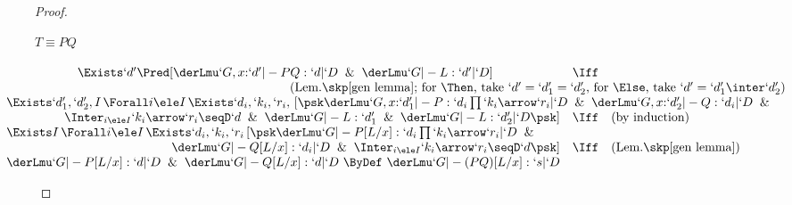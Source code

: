 \documentclass{CSML}
\newcommand{\Comment}[1]{}
\begin{document}
\begin{proof}
\begin{enumerate}
\begin{description}
\Comment{%
 \item [$ T\same `l y.N $] 
$ \kern-24mm \begin{array}[t]{lcl} \kern24mm 
\derLmu `G,x{:}`d' |- `ly.N : `d | `D \And \derLmu `G |- L : `d' | `D 
	& \Iff & (\textrm{Lem.\skp\ref{gen lemma}}) \\
\multicolumn{3}{l}{ 
\Exists I \, \Forall i \ele I \, \Exists `d_i,`k_i,`r_i \Pred[ \derLmu `G,x{:}`d',y{:}`d_i |- N : `k_i\arrow `r_i | `D \And \Inter_{i \ele I} `d_i\prod `k_i\arrow `r_i \seqD `d \And \derLmu `G |- L : `d' | `D ] 
} \\ 
	& \Iff & (\textrm{by induction}) \\
\multicolumn{3}{l}{ 
\Exists I \, \Forall i \ele I \, \Exists `d_i,`k_i,`r_i \Pred[ \derLmu `G, y{:}`d_i |- N[L/x] : `k_i\arrow `r_i | `D \And \Inter_{i \ele I} `d_i\prod `k_i\arrow `r_i \seqD `d ] 
} \\
	& \Iff & (\textrm{Lem.\skp\ref{gen lemma}}) \\
\derLmu `G |- `ly.(N[L/x]) : `d | `D 
	~ \ByDef ~ 
\derLmu `G |- (`ly.N)[L/x] : `d | `D
 \end{array} $
 \arrayqed
}%

 \item [$ T \equiv PQ $] 
$ \kern-20mm \begin{array}[t]{lcl} \kern20mm 
\Exists `d' \Pred[ \derLmu `G,x{:}`d' |- PQ : `d | `D \And \derLmu `G |- L : `d' | `D ]
	& \Iff & \\ %
\multicolumn{3}{r}{(\textrm{Lem.\skp\ref{gen lemma}; for $\Then$, take $`d' = `d'_1 = `d'_2$, for $\Else$, take $`d' = `d'_1 \inter `d'_2$}) } \\
\multicolumn{3}{l}{\Exists `d'_1,`d'_2, I \, \Forall i \ele I \, \Exists `d_i,`k_i,`r_i, \, [\psk \derLmu `G,x{:}`d'_1 |- P : `d_i\prod `k_i\arrow `r_i | `D \And \derLmu `G,x{:}`d'_2 |- Q : `d_i | `D \And }
	\quad \\ ~ \quad \hfill 
\Inter_{i \ele I}`k_i\arrow `r_i \seqD `d \And \derLmu `G |- L : `d_1' \And \derLmu `G |- L : `d_2' | `D \psk] 
	& \Iff & (\textrm{by induction}) \\
\Exists I \, \Forall i \ele I \, \Exists `d_i,`k_i,`r_i \, [\psk \derLmu `G |- P[L/x] : `d_i\prod `k_i\arrow `r_i | `D \And 
	\quad \\ ~ \quad \hfill 
\derLmu `G |- Q[L/x] : `d_i | `D \And \Inter_{i \ele I}`k_i\arrow `r_i \seqD `d \psk] 
	& \Iff & (\textrm{Lem.\skp\ref{gen lemma}}) \\
\derLmu `G |- P[L/x] : `d | `D \And \derLmu `G |- Q[L/x] : `d | `D 
	~ \ByDef ~ 
\derLmu `G |- (PQ)[L/x] : `s | `D
 \end{array} $


\end{description}
\end{enumerate}
\end{proof}
\end{document}
